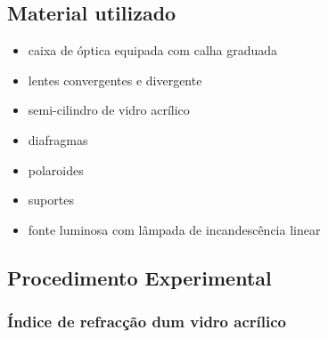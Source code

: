 \documentclass[a4paper,12pt]{article}      %
\begin{document}

\subsection{\sf Material utilizado}
\begin{itemize}
\item caixa de óptica equipada com calha graduada
\item lentes convergentes e divergente
\item semi-cilindro de vidro acrílico
\item diafragmas
\item polaroides
\item suportes
\item fonte luminosa com lâmpada de incandescência linear
\end{itemize}



\subsection{\sf Procedimento Experimental}

\subsubsection{\sf  Índice de refracção dum vidro acrílico }
\end{document}
